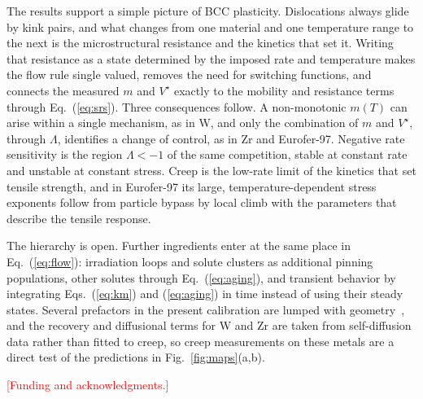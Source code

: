 \documentclass[aps,prl,twocolumn,superscriptaddress,amsmath,amssymb,floatfix]{revtex4-2}
\newcommand{\todo}[1]{\textcolor{red}{[#1]}}
\begin{document}
The results support a simple picture of BCC plasticity. Dislocations always glide by kink pairs, and what changes from one material and one temperature range to the next is the microstructural resistance and the kinetics that set it. Writing that resistance as a state determined by the imposed rate and temperature makes the flow rule single valued, removes the need for switching functions, and connects the measured $m$ and $V^\star$ exactly to the mobility and resistance terms through Eq.~(\ref{eq:srs}). Three consequences follow. A non-monotonic $m(T)$ can arise within a single mechanism, as in W, and only the combination of $m$ and $V^\star$, through $\Lambda$, identifies a change of control, as in Zr and Eurofer-97. Negative rate sensitivity is the region $\Lambda<-1$ of the same competition, stable at constant rate and unstable at constant stress. Creep is the low-rate limit of the kinetics that set tensile strength, and in Eurofer-97 its large, temperature-dependent stress exponents follow from particle bypass by local climb with the parameters that describe the tensile response.

The hierarchy is open. Further ingredients enter at the same place in Eq.~(\ref{eq:flow}): irradiation loops and solute clusters as additional pinning populations, other solutes through Eq.~(\ref{eq:aging}), and transient behavior by integrating Eqs.~(\ref{eq:km}) and (\ref{eq:aging}) in time instead of using their steady states. Several prefactors in the present calibration are lumped with geometry~\cite{SM}, and the recovery and diffusional terms for W and Zr are taken from self-diffusion data rather than fitted to creep, so creep measurements on these metals are a direct test of the predictions in Fig.~\ref{fig:maps}(a,b).

\begin{acknowledgments}
\todo{Funding and acknowledgments.}
\end{acknowledgments}
\end{document}
